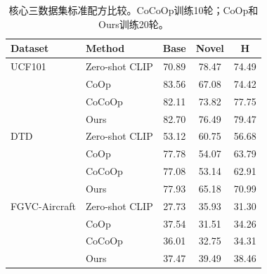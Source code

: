 \begin{table}[t]
\centering
\caption{核心三数据集标准配方比较。CoCoOp训练10轮；CoOp和Ours训练20轮。}
\label{tab:cocoop_core}
\begin{tabular}{llccc}
\toprule
Dataset & Method & Base & Novel & H \\
\midrule
UCF101 & Zero-shot CLIP & 70.89 & 78.47 & 74.49 \\
 & CoOp & 83.56 & 67.08 & 74.42 \\
 & CoCoOp & 82.11 & 73.82 & 77.75 \\
 & Ours & 82.70 & 76.49 & 79.47 \\
\midrule
DTD & Zero-shot CLIP & 53.12 & 60.75 & 56.68 \\
 & CoOp & 77.78 & 54.07 & 63.79 \\
 & CoCoOp & 77.08 & 53.14 & 62.91 \\
 & Ours & 77.93 & 65.18 & 70.99 \\
\midrule
FGVC-Aircraft & Zero-shot CLIP & 27.73 & 35.93 & 31.30 \\
 & CoOp & 37.54 & 31.51 & 34.26 \\
 & CoCoOp & 36.01 & 32.75 & 34.31 \\
 & Ours & 37.47 & 39.49 & 38.46 \\
\bottomrule
\end{tabular}
\end{table}
